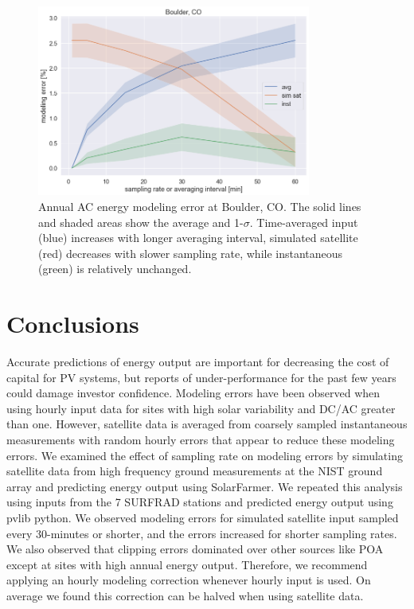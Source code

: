 \documentclass[conference]{IEEEtran}
\begin{document}
\begin{figure}[htbp]
\centerline{\includegraphics[width=9cm]{analysis/tbl_all.png}}
\caption{Annual AC energy modeling error at Boulder, CO. The solid lines and shaded areas show the average and 1-$\sigma$. Time-averaged input (blue) increases with longer averaging interval, simulated satellite (red) decreases with slower sampling rate, while instantaneous (green) is relatively unchanged.}
\label{fig:tbl2010}
\end{figure}

\section{Conclusions}
Accurate predictions of energy output are important for decreasing the cost of capital for PV systems, but reports of under-performance for the past few years could damage investor confidence. Modeling errors have been observed when using hourly input data for sites with high solar variability and DC/AC greater than one. However, satellite data is averaged from coarsely sampled instantaneous measurements with random hourly errors that appear to reduce these modeling errors. We examined the effect of sampling rate on modeling errors by simulating satellite data from high frequency ground measurements at the NIST ground array and predicting energy output using SolarFarmer. We repeated this analysis using inputs from the 7 SURFRAD stations and predicted energy output using pvlib python. We observed modeling errors for simulated satellite input sampled every 30-minutes or shorter, and the errors increased for shorter sampling rates. We also observed that clipping errors dominated over other sources like POA except at sites with high annual energy output. Therefore, we recommend applying an hourly modeling correction whenever hourly input is used. On average we found this correction can be halved when using satellite data.



\end{document}
